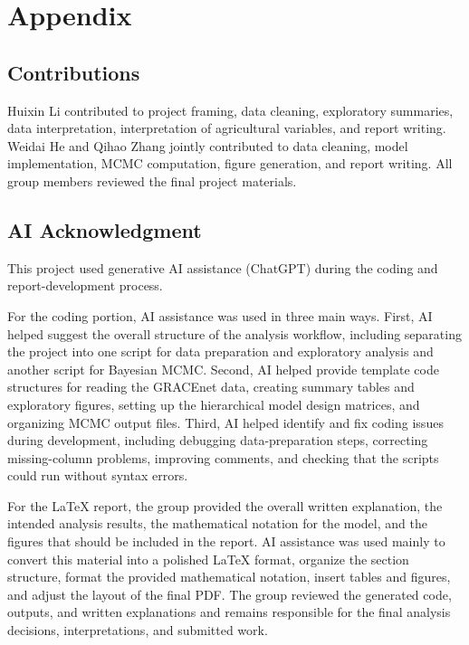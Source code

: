 \documentclass[11pt]{article}
\begin{document}
\clearpage
\section*{Appendix}

\subsection*{Contributions}

Huixin Li contributed to project framing, data cleaning, exploratory summaries, data interpretation, interpretation of agricultural variables, and report writing. Weidai He and Qihao Zhang jointly contributed to data cleaning, model implementation, MCMC computation, figure generation, and report writing. All group members reviewed the final project materials.

\subsection*{AI Acknowledgment}

This project used generative AI assistance (ChatGPT) during the coding and report-development process.

For the coding portion, AI assistance was used in three main ways. First, AI helped suggest the overall structure of the analysis workflow, including separating the project into one script for data preparation and exploratory analysis and another script for Bayesian MCMC. Second, AI helped provide template code structures for reading the GRACEnet data, creating summary tables and exploratory figures, setting up the hierarchical model design matrices, and organizing MCMC output files. Third, AI helped identify and fix coding issues during development, including debugging data-preparation steps, correcting missing-column problems, improving comments, and checking that the scripts could run without syntax errors.

For the LaTeX report, the group provided the overall written explanation, the intended analysis results, the mathematical notation for the model, and the figures that should be included in the report. AI assistance was used mainly to convert this material into a polished LaTeX format, organize the section structure, format the provided mathematical notation, insert tables and figures, and adjust the layout of the final PDF. The group reviewed the generated code, outputs, and written explanations and remains responsible for the final analysis decisions, interpretations, and submitted work.
\end{document}
